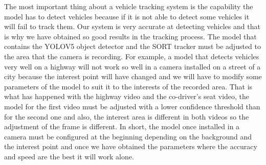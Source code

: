 \begin{sloppypar}
The  most  important  thing  about  a  vehicle  tracking  system  is  the  capability  the  model  has  to 
detect  vehicles  because  if  it  is  not  able  to  detect  some  vehicles  it  will  fail  to  track  them.  Our 
system is very accurate at detecting vehicles and that is why we have obtained so good results 
in  the  tracking  process.  The  model  that  contains  the  YOLOV5  object  detector  and  the  SORT 
tracker must be adjusted to the area that the camera is recording. For example, a model that 
detects vehicles very well on a highway will not work so well in a camera installed on a street of 
a city because the interest point will have changed and we will have to modify some parameters 
of the model to suit it to the interests of the recorded area. That is what has happened with the 
highway video and the co-driver’s seat video, the model for the first video must be adjusted with 
a lower confidence threshold than for the second one and also, the interest area is different in 
both videos so the adjustment of the frame is different. In short, the model once installed in a 
camera  must  be  configured  at  the  beginning  depending  on  the  background  and  the  interest 
point and once we have obtained the parameters where the accuracy and speed are the best it 
will work alone. 

\end{sloppypar}


\clearpage{} %



{}
\specialsection %
\headerspecialsection

{\hypersetup{urlcolor=ntnu,linkcolor=sophia} %


}


\vspace{2.81ex}

\begin{center}
    {\color{sophia} \Huge
    }
\end{center}
